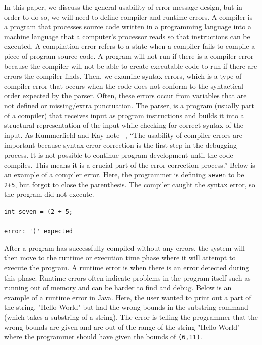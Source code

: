 \documentclass{sig-alternate}
\begin{document}
In this paper, we discuss the general usability of error message design, but in order to do so, we will need to define compiler and runtime errors.
A compiler is a program that processes source code written in a programming language into a machine language that a computer's processor reads so that instructions can be executed.
A compilation error refers to a state when a compiler fails to compile a piece of  program source code.
A program will not run if there is a compiler error because the compiler will not be able to create executable code to run if there are errors the compiler finds. 
Then, we examine syntax errors, which is a type of compiler error that occurs when the code does not conform to the syntactical order expected by the parser.
Often, these errors occur from variables that are not defined or missing/extra punctuation.
The parser, is a program (usually part of a compiler) that receives input as program instructions and builds it into a structural representation of the input while checking for correct syntax of the input.
As Kummerfield and Kay note ~\cite{Kummerfeld:2003:NBF:858403.858416}, ``The usability of compiler errors are important because syntax error correction is the first step in the debugging process. It is not possible to continue program development until the code compiles. This means it is a crucial part of the error correction process.''
Below is an example of a compiler error. Here, the programmer is defining \texttt{seven} to be \texttt{2+5}, but forgot to close the parenthesis. The compiler caught the syntax error, so the program did not execute.

\begin{verbatim}
int seven = (2 + 5;

error: ')' expected
\end{verbatim}

After a program has successfully compiled without any errors, the system will then move to the runtime or execution time phase where it will attempt to execute the program.
A runtime error is when there is an error detected during this phase.
Runtime errors often indicate problems in the program itself such as running out of memory and can be harder to find and debug.
Below is an example of a runtime error in Java.
Here, the user wanted to print out a part of the string, "Hello World" but had the wrong bounds in the substring command (which takes a substring of a string).
The error is telling the programmer that the wrong bounds are given and are out of the range of the string "Hello World" where the programmer should have given the bounds of \texttt{(6,11)}.
\end{document}
